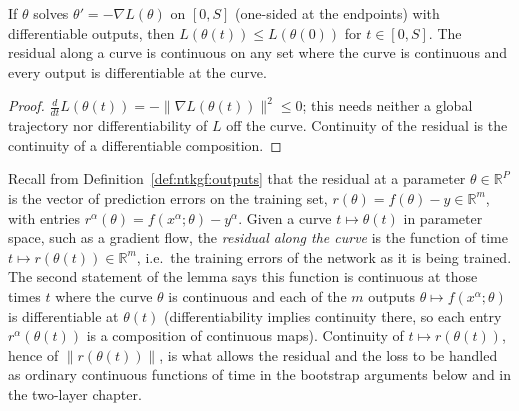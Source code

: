 \begin{lemma}\label{lem:ntkgf:lossMonotone}
  \leanok
If $\theta$ solves $\theta'=-\nabla L(\theta)$ on $[0,S]$ (one-sided at the endpoints) with differentiable outputs, then $L(\theta(t))\le L(\theta(0))$ for $t\in[0,S]$.
The residual along a curve is continuous on any set where the curve is continuous and every output is differentiable at the curve.
\end{lemma}

\begin{proof}
  \leanok
$\frac d{dt}L(\theta(t))=-\|\nabla L(\theta(t))\|^2\le0$; this needs neither a global trajectory nor differentiability of $L$ off the curve. Continuity of the residual is the continuity of a differentiable composition.
\end{proof}

\begin{remark}\label{rmk:ntkgf:residualAlongCurve}
Recall from Definition~\ref{def:ntkgf:outputs} that the residual at a parameter $\theta\in\mathbb R^P$ is the vector of prediction errors on the training set,
$r(\theta)=f(\theta)-y\in\mathbb R^m$, with entries $r^\alpha(\theta)=f(x^\alpha;\theta)-y^\alpha$.
Given a curve $t\mapsto\theta(t)$ in parameter space, such as a gradient flow, the \emph{residual along the curve} is the function of time $t\mapsto r(\theta(t))\in\mathbb R^m$, i.e.\ the training errors of the network as it is being trained.
The second statement of the lemma says this function is continuous at those times $t$ where the curve $\theta$ is continuous and each of the $m$ outputs $\theta\mapsto f(x^\alpha;\theta)$ is differentiable at $\theta(t)$ (differentiability implies continuity there, so each entry $r^\alpha(\theta(t))$ is a composition of continuous maps).
Continuity of $t\mapsto r(\theta(t))$, hence of $\|r(\theta(t))\|$, is what allows the residual and the loss to be handled as ordinary continuous functions of time in the bootstrap arguments below and in the two-layer chapter.
\end{remark}

